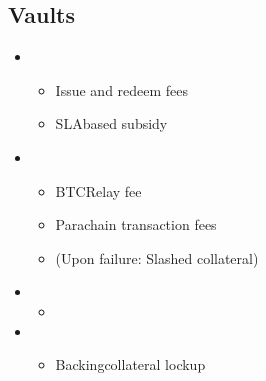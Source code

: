 \documentclass[a4paper,10pt,english]{sphinxmanual}
\begin{document}
\subsection{Vaults}
\label{\detokenize{economics/fees:vaults}}\begin{itemize}
\item {} 
\begin{itemize}
\item {} 
Issue and redeem fees

\item {} 
SLA\sphinxhyphen{}based subsidy

\end{itemize}

\item {} 
\begin{itemize}
\item {} 
BTC\sphinxhyphen{}Relay fee

\item {} 
Parachain transaction fees

\item {} 
(Upon failure: Slashed collateral)

\end{itemize}

\item {} 
\begin{itemize}
\item {} 

\end{itemize}

\item {} 
\begin{itemize}
\item {} 
Backing\sphinxhyphen{}collateral lockup

\end{itemize}

\end{itemize}
\end{document}

